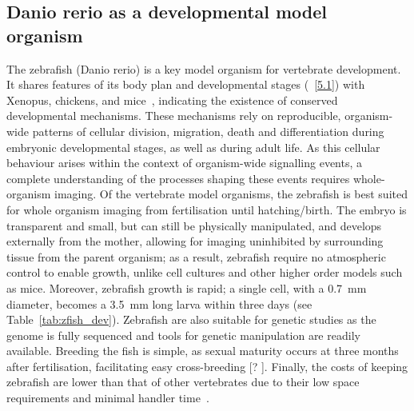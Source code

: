 \subsection{Danio rerio as a developmental model organism}
The zebrafish (Danio rerio) is a key model organism for vertebrate development.
It shares features of its body plan and developmental stages (\figurename~\ref{5.1}) with Xenopus, chickens, and mice~\cite{wolpertPrinciplesDevelopment2006}, indicating the existence of conserved developmental mechanisms.
These mechanisms rely on reproducible, organism-wide patterns of cellular division, migration, death and differentiation during embryonic developmental stages, as well as during adult life.
As  this cellular behaviour arises within the context of organism-wide signalling events, a complete understanding of the processes shaping these events requires whole-organism imaging.
Of the vertebrate model organisms, the zebrafish is best suited for whole organism imaging from fertilisation until hatching/birth.
The embryo is transparent and small, but can still be physically manipulated, and develops externally from the mother, allowing for imaging uninhibited by surrounding tissue from the parent organism; as a result, zebrafish require no atmospheric control to enable growth, unlike cell cultures and other higher order models such as mice.
Moreover, zebrafish growth is rapid; a single cell, with a \SI{0.7}{\milli\meter} diameter, becomes a \SI{3.5}{\milli\meter} long larva within three days (see Table~\ref{tab:zfish_dev}).
Zebrafish are also suitable for genetic studies as the genome is fully sequenced and tools for genetic manipulation are readily available.
Breeding the fish is simple, as sexual maturity occurs at three months after fertilisation, facilitating easy cross-breeding [? ].
Finally, the costs of keeping zebrafish are lower than that of other vertebrates due to their low space requirements and minimal handler time~\cite{AnimalModelsHuman}.

